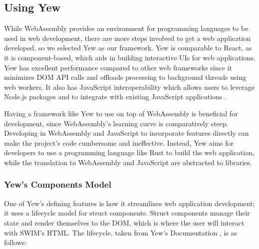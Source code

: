 \documentclass[
    paper=letter,
    parskip=half,
    fontsize=12pt,
    titlepage=firstiscover,
    toc=bibliography,
    numbers=endperiod
]{scrartcl}
\begin{document}
\subsection{Using Yew}

While WebAssembly provides an environment for programming languages to
be used in web development, there are more steps involved to get a web
application developed, so we selected Yew as our framework. Yew is
comparable to React, as it is component-based, which aids in building
interactive UIs for web applications. Yew has excellent performance
compared to other web frameworks since it minimizes DOM API calls and
offloads processing to background threads using web workers. It also has
JavaScript interoperability which allows users to leverage Node.js
packages and to integrate with existing JavaScript applications
\cite{malomo2022}.

Having a framework like Yew to use on top of WebAssembly is beneficial
for development, since WebAssembly's learning curve is comparatively
steep. Developing in WebAssembly and JavaScript to incorporate features
directly can make the project's code cumbersome and ineffective.
Instead, Yew aims for developers to use a programming language like Rust
to build the web application, while the translation to WebAssembly and
JavaScript are abstracted to libraries.

\subsubsection{Yew's Components Model}

One of Yew's defining features is how it streamlines web application
development; it uses a lifecycle model for struct components. Struct
components manage their state and render themselves to the DOM, which is
where the user will interact with SWIM's HTML. The lifecycle, taken from
Yew's Documentation \cite{yew-lifecycle}, is as follows:
\end{document}
